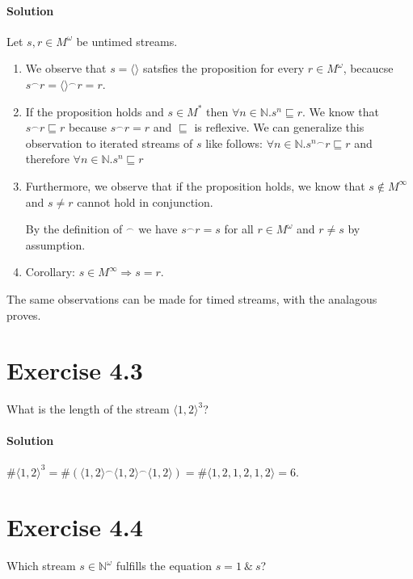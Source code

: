 \documentclass{article}[12pt]
\newcommand{\concat}{\ensuremath{^{\frown}}}
\newcommand{\cons}{\ \&\ }
\newcommand{\stream}[1]{\langle#1\rangle}
\newcommand{\naturals}{\ensuremath{\mathbb{N}}}
\newcommand{\prefixordering}{\ensuremath{\sqsubseteq}}
\newcommand{\length}{\ensuremath{\#}}
\begin{document}
   \paragraph{Solution}{
       Let $s, r \in M^{\omega}$ be untimed streams.

       \begin{enumerate}
           \item{
            We observe that $s = \stream{}$ satsfies the proposition for every $r \in M^{\omega}$, becaucse $s \concat r = \stream{} \concat r = r$.
           }
           \item{
            If the proposition holds and $s \in M^{*}$ then $\forall n \in \naturals . s^n \prefixordering r$. 
            We know that $s \concat r \prefixordering r$ because $s \concat r = r$ and $\prefixordering$ is reflexive.
            We can generalize this observation to iterated streams of $s$ like follows:
            $\forall n \in \naturals . {s^n} \concat r \prefixordering r$ and therefore $\forall n \in \naturals . {s^n} \prefixordering r$
           }
           \item{
            Furthermore, we observe that if the proposition holds, we know that $s \notin M^{\infty}$ and $s \neq r$ cannot hold in conjunction.

            By the definition of $\concat$ we have $s \concat r = s$ for all $r \in M^{\omega}$ and $r \neq s$ by assumption.
           }
           \item {
               Corollary: $s \in M^{\infty} \Rightarrow s = r$.
           }
       \end{enumerate}

       The same observations can be made for timed streams, with the analagous proves.

   }
   \section{Exercise 4.3}
   What is the length of the stream $\stream{1,2}^{3}$?

   \paragraph{Solution}{
       $\length \stream{1,2}^3 = \length(\stream{1,2} \concat \stream{1,2} \concat \stream{1,2}) = \length \stream{1,2,1,2,1,2} = 6$.
    }
   \section{Exercise 4.4}
   Which stream $s \in \naturals^{\omega}$ fulfills the equation $s = 1 \cons s$?
\end{document}
